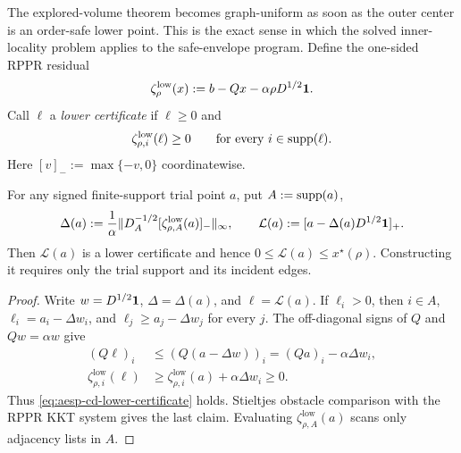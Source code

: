 The explored-volume theorem becomes graph-uniform as soon as the outer center
is an order-safe lower point.  This is the exact sense in which the solved
inner-locality problem applies to the safe-envelope program.  Define the
one-sided RPPR residual
\begin{equation*}
 \zeta_\rho^{\mathrm{low}}(x)
 :=b-Qx-\alpha\rho D^{1/2}\mathbf{1}.
\end{equation*}
Call $\ell$ a \emph{lower certificate} if $\ell\geq0$ and
\begin{equation}
 \zeta_{\rho,i}^{\mathrm{low}}(\ell)\geq0
 \qquad\text{for every }i\in\operatorname{supp}(\ell).
 \label{eq:aesp-cd-lower-certificate}
\end{equation}
Here $[v]_-:=\max\{-v,0\}$ coordinatewise.

\begin{lemma}
\label{lem:aesp-cd-lower-retraction}
For any signed finite-support trial point $a$, put $A:=\operatorname{supp}(a)$,
\begin{equation}
 \Delta(a):=\frac1\alpha
  \lVert D_A^{-1/2}
    [\zeta_{\rho,A}^{\mathrm{low}}(a)]_-\rVert_\infty,
 \qquad
 \mathcal L(a):=[a-\Delta(a)D^{1/2}\mathbf{1}]_+.
 \label{eq:aesp-cd-lower-retraction}
\end{equation}
Then $\mathcal L(a)$ is a lower certificate and hence
$0\leq\mathcal L(a)\leq x^\star(\rho)$.  Constructing it requires only the
trial support and its incident edges.
\end{lemma}

\begin{proof}
Write $w=D^{1/2}\mathbf{1}$, $\Delta=\Delta(a)$, and
$\ell=\mathcal L(a)$.  If $\ell_i>0$, then $i\in A$,
$\ell_i=a_i-\Delta w_i$, and $\ell_j\geq a_j-\Delta w_j$ for every $j$.
The off-diagonal signs of $Q$ and $Qw=\alpha w$ give
\begin{align*}
 (Q\ell)_i
 &\leq(Q(a-\Delta w))_i
   =(Qa)_i-\alpha\Delta w_i,\\
 \zeta_{\rho,i}^{\mathrm{low}}(\ell)
 &\geq\zeta_{\rho,i}^{\mathrm{low}}(a)
       +\alpha\Delta w_i\geq0.
\end{align*}
Thus \cref{eq:aesp-cd-lower-certificate} holds.  Stieltjes obstacle
comparison with the RPPR KKT system gives the last claim.  Evaluating
$\zeta_{\rho,A}^{\mathrm{low}}(a)$ scans only adjacency lists in $A$.
\end{proof}

